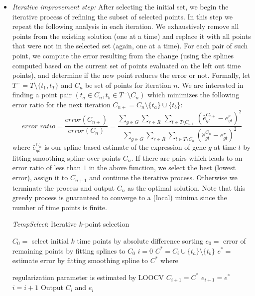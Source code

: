 \documentclass[10pt]{article}
\newcommand{\Tempselect}{\textit{TempSelect}\xspace}
\begin{document}
\begin{itemize}
\item {\em Iterative improvement step:} After selecting the initial set, we begin the iterative process of refining the subset of selected points.
In this step we repeat the following analysis in each iteration. We
exhaustively remove all points from the existing solution (one at a
time) and replace it with all points that were not in the selected
set (again, one at a time). For each pair of such point, we compute
the error resulting from the change (using the splines computed
based on the current set of points evaluated on the left out time
points), and determine if the new point reduces the error or not.
Formally, let $T^{-} = T \setminus \{t_{1}, t_{T}\}$ and $C_n$ be set of points for iteration $n$. We are
interested in finding a point pair $(t_{a} \in C_n, t_{b} \in T^{-}
\setminus C_n)$ which minimizes the following error ratio for the next iteration $C_{n+} =
C_n \setminus \{t_{a}\} \cup \{t_{b}\}$:
%
\begin{equation}
\textit{error ratio} = \frac{error(C_{n+})}{error(C_{n})} = \frac{\sum_{g \in G} \sum_{r \in R}\, \sum_{t \in
    T \setminus C_{n+}} (\hat{e}_{gt}^{C_{n+}} - e_{gt}^{r})^{2}}{\sum_{g \in G}
  \sum_{r \in R} \sum_{t \in
    T \setminus C_{n}} (\hat{e}_{gt}^{C_{n}} - e_{gt}^{r})^{2}}
\end{equation}
%
where $\hat{e}_{gt}^{C_{n}}$ is our spline based estimate of the expression
of gene $g$ at time $t$ by fitting smoothing spline over points
$C_{n}$. If there are pairs which leads to an error ratio
of less than $1$ in the above function, we select the best (lowest
error), assign it to $C_{n+1}$ and continue the iterative process. Otherwise we terminate
the process and output $C_n$ as the optimal solution. Note that this
greedy process is guaranteed to converge to a (local) minima since
the number of time points is finite.


\begin{algorithm}
\caption{\Tempselect: Iterative $k$-point selection}
\label{alg:algo}
\begin{algorithmic}[1]
\State $C_{0} = $ select initial $k$ time points by absolute difference sorting
\State $e_{0} = $ error of remaining points by fitting splines to $C_{0}$
\State $i=0$
\Do 
{}
\State $C^{*} = C_{i} \cup \{ t_{a} \} \setminus \{ t_{b}\}$ 
\State $e^{*} = $ estimate error by fitting smoothing spline to
$C^{*}$ where \par 
\hspace{1.62cm} regularization parameter is estimated by LOOCV
\State $C_{i+1} = C^{*}$ 
\State $e_{i+1} = e^{*}$
\EndIf
\State $i = i+1$
\EndFor
{}
\State Output $C_{i}$ and $e_{i}$
\EndProcedure
\end{algorithmic}
\end{algorithm}


\end{itemize}
\end{document}
